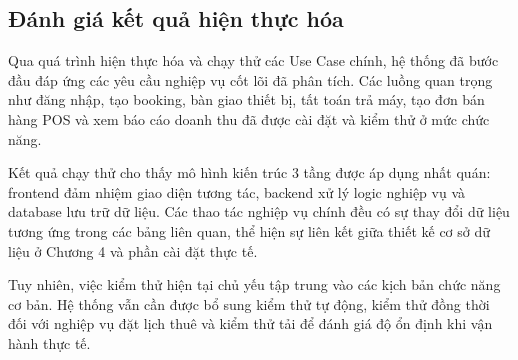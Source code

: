 \subsection{Đánh giá kết quả hiện thực hóa}

Qua quá trình hiện thực hóa và chạy thử các Use Case chính, hệ thống đã bước đầu đáp ứng các yêu cầu nghiệp vụ cốt lõi đã phân tích. Các luồng quan trọng như đăng nhập, tạo booking, bàn giao thiết bị, tất toán trả máy, tạo đơn bán hàng POS và xem báo cáo doanh thu đã được cài đặt và kiểm thử ở mức chức năng.

Kết quả chạy thử cho thấy mô hình kiến trúc 3 tầng được áp dụng nhất quán: frontend đảm nhiệm giao diện tương tác, backend xử lý logic nghiệp vụ và database lưu trữ dữ liệu. Các thao tác nghiệp vụ chính đều có sự thay đổi dữ liệu tương ứng trong các bảng liên quan, thể hiện sự liên kết giữa thiết kế cơ sở dữ liệu ở Chương 4 và phần cài đặt thực tế.

Tuy nhiên, việc kiểm thử hiện tại chủ yếu tập trung vào các kịch bản chức năng cơ bản. Hệ thống vẫn cần được bổ sung kiểm thử tự động, kiểm thử đồng thời đối với nghiệp vụ đặt lịch thuê và kiểm thử tải để đánh giá độ ổn định khi vận hành thực tế.

\cleardoublepage